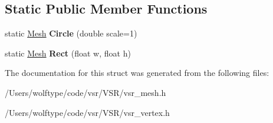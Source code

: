 \subsection*{Static Public Member Functions}
\begin{DoxyCompactItemize}
\item 
\hypertarget{structvsr_1_1_mesh_ab9be5300eaa5f86b6bb02a0fd5364b9b}{static \hyperlink{structvsr_1_1_mesh}{Mesh} {\bfseries Circle} (double scale=1)}\label{structvsr_1_1_mesh_ab9be5300eaa5f86b6bb02a0fd5364b9b}

\item 
\hypertarget{structvsr_1_1_mesh_a5a963fbceb7e61446ec17ed3eae51351}{static \hyperlink{structvsr_1_1_mesh}{Mesh} {\bfseries Rect} (float w, float h)}\label{structvsr_1_1_mesh_a5a963fbceb7e61446ec17ed3eae51351}

\end{DoxyCompactItemize}


The documentation for this struct was generated from the following files\-:\begin{DoxyCompactItemize}
\item 
/\-Users/wolftype/code/vsr/\-V\-S\-R/vsr\-\_\-mesh.\-h\item 
/\-Users/wolftype/code/vsr/\-V\-S\-R/vsr\-\_\-vertex.\-h\end{DoxyCompactItemize}
